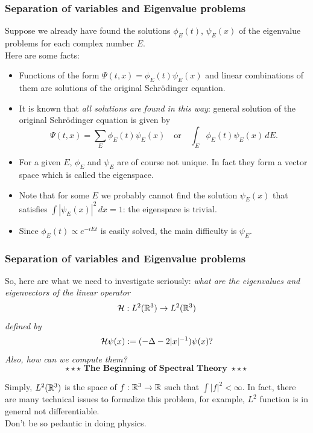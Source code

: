 \documentclass[10pt,handout]{beamer}
\begin{document}
\begin{frame}
\frametitle{Separation of variables and Eigenvalue problems}
  Suppose we already have found the solutions $\phi_E(t)$, $\psi_E(x)$ of the eigenvalue problems for each complex number $E$.\\
  Here are some facts:
  \pause
  \begin{itemize}[<+->]
    \item Functions of the form $\Psi(t,x)=\phi_E(t)\psi_E(x)$ and linear combinations of them are solutions of the original Schr\"odinger equation.
    \item It is known that \emph{all solutions are found in this way}: general solution of the original Schr\"odinger equation is given by
    \[\Psi(t,x)=\sum_E\phi_E(t)\psi_E(x)\quad\text{or}\quad\int_E\phi_E(t)\psi_E(x)\,dE.\]
    \item For a given $E$, $\phi_E$ and $\psi_E$ are of course not unique. In fact they form a vector space which is called the eigenspace.
    \item Note that for some $E$ we probably cannot find the solution $\psi_E(x)$ that satisfies $\int|\psi_E(x)|^2\,dx=1$: the eigenspace is trivial.
    \item Since $\phi_E(t)\propto e^{-iEt}$ is easily solved, the main difficulty is $\psi_E$.
  \end{itemize}
\end{frame}

\begin{frame}
\frametitle{Separation of variables and Eigenvalue problems}
  So, here are what we need to investigate seriously:
  \pause\emph{what are the eigenvalues and eigenvectors of the linear operator}
  \[\cH:L^2(\R^3)\to L^2(\R^3)\]
  \emph{defined by}
  \[\mathcal{H}\psi(x):=(-\Delta-2|x|^{-1})\psi(x)?\]
  \emph{Also, how can we compute them?}
  \pause \[\star\star\star\textbf{ The Beginning of Spectral Theory }\star\star\star\]
  \pause \vspace{-2em}
  \begin{rmk}
    Simply, $L^2(\mathbb{R}^3)$ is the space of $f:\R^3\to\R$ such that $\int|f|^2<\infty$. In fact, there are many technical issues to formalize this problem, for example, $L^2$ function is in general not differentiable.\\
    \pause Don't be so pedantic in doing physics.
  \end{rmk}
\end{frame}
\end{document}
